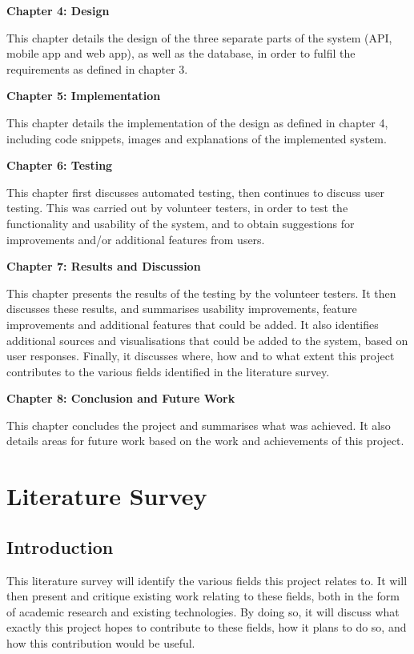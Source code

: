\documentclass[11pt,openright,a4paper]{report}
\begin{document}
\textbf{Chapter 4: Design}

This chapter details the design of the three separate parts of the system (API, mobile app and web app), as well as the database, in order to fulfil the requirements as defined in chapter 3.

\textbf{Chapter 5: Implementation}

This chapter details the implementation of the design as defined in chapter 4, including code snippets, images and explanations of the implemented system.

\textbf{Chapter 6: Testing}

This chapter first discusses automated testing, then continues to discuss user testing. This was carried out by volunteer testers, in order to test the functionality and usability of the system, and to obtain suggestions for improvements and/or additional features from users.

\textbf{Chapter 7: Results and Discussion}

This chapter presents the results of the testing by the volunteer testers. It then discusses these results, and summarises usability improvements, feature improvements and additional features that could be added. It also identifies additional sources and visualisations that could be added to the system, based on user responses. Finally, it discusses where, how and to what extent this project contributes to the various fields identified in the literature survey.

\textbf{Chapter 8: Conclusion and Future Work}

This chapter concludes the project and summarises what was achieved. It also details areas for future work based on the work and achievements of this project.

\chapter{Literature Survey} \label{litsurvey}
\section{Introduction} \label{introduction}
This literature survey will identify the various fields this project relates to. It will then present and critique existing work relating to these fields, both in the form of academic research and existing technologies. By doing so, it will discuss what exactly this project hopes to contribute to these fields, how it plans to do so, and how this contribution would be useful.
\end{document}
